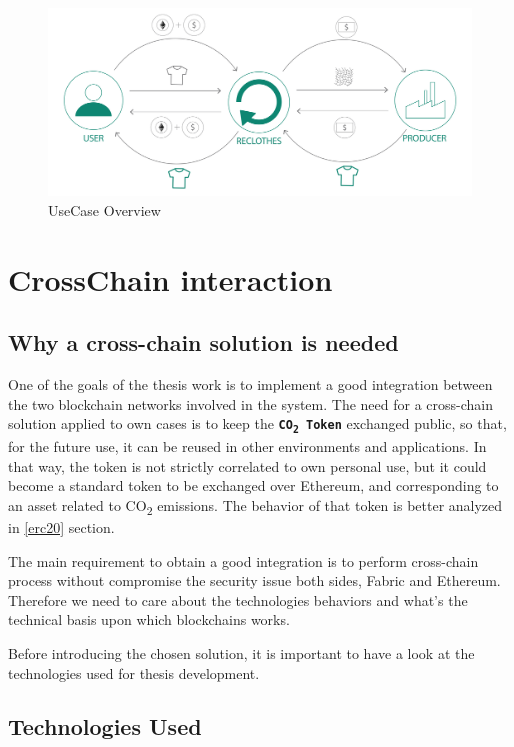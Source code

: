 \begin{figure}[h!]
	\centering
	\includegraphics[totalheight=6cm]{img/use-case-schema.png}
	\caption{UseCase Overview}
	\label{fig:schema}
\end{figure}

\clearpage
\section{CrossChain interaction}

\subsection{Why a cross-chain solution is needed}

One of the goals of the thesis work is to implement a good integration between the two blockchain networks 
involved in the system. The need for a cross-chain solution applied to own cases is to keep the 
\textbf{\texttt{CO\textsubscript{2} Token}} exchanged public, so that, for the future use, it can be 
reused in other environments and applications. In that way, the token is not strictly correlated to own 
personal use, but it could become a standard token to be exchanged over Ethereum, and corresponding to an 
asset related to CO\textsubscript{2} emissions. The behavior of that token is better analyzed in \ref{erc20} 
section.
\bigskip

The main requirement to obtain a good integration is to perform cross-chain process without compromise the 
security issue both sides, Fabric and Ethereum. Therefore we need to care about the technologies behaviors 
and what's the technical basis upon which blockchains works. 
\bigskip

Before introducing the chosen solution, it is important to have a look at the technologies used for 
thesis development. 

\subsection{Technologies Used}

